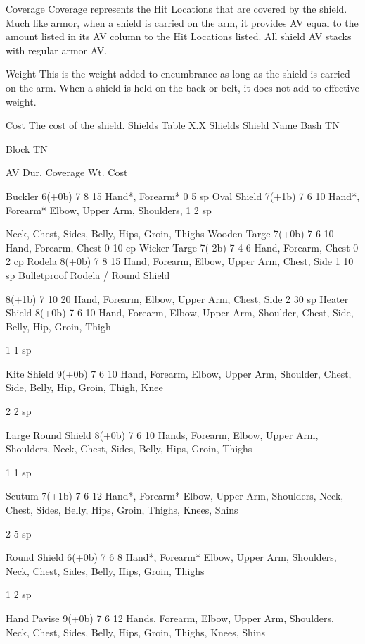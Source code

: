 \documentclass[oneside,11pt,english]{book}
\begin{document}
Coverage 
Coverage represents the Hit Locations that are covered by the shield. Much like armor, when a shield is 
carried on the arm, it provides AV equal to the amount listed in its AV column to the Hit Locations listed. 
All shield AV stacks with regular armor AV. 

 

Weight 
This is the weight added to encumbrance as long as the shield is carried on the arm. When a shield is held 
on the back or belt, it does not add to effective weight. 

 

Cost 
The cost of the shield. 
Shields 
Table X.X Shields 
Shield Name Bash 
TN 

Block 
TN 

AV Dur. Coverage Wt. Cost 

Buckler 6(+0b) 7 8 15 Hand*, Forearm* 0 5 sp 
Oval Shield 7(+1b) 7 6 10 Hand*, Forearm* Elbow, Upper Arm, Shoulders, 1 2 sp 


Neck, Chest, Sides, Belly, Hips, Groin, Thighs 
Wooden Targe 7(+0b) 7 6 10 Hand, Forearm, Chest 0 10 
cp 
Wicker Targe 7(-2b) 7 4 6 Hand, Forearm, Chest 0 2 cp 
Rodela 8(+0b) 7 8 15 Hand, Forearm, Elbow, Upper Arm, Chest, Side 1 10 
sp 
Bulletproof Rodela / 
Round Shield 

8(+1b) 7 10 20 Hand, Forearm, Elbow, Upper Arm, Chest, Side 2 30 
sp 
Heater Shield 8(+0b) 7 6 10 Hand, Forearm, Elbow, Upper Arm, Shoulder, Chest, 
Side, Belly, Hip, Groin, Thigh 

1 1 sp 

Kite Shield 9(+0b) 7 6 10 Hand, Forearm, Elbow, Upper Arm, Shoulder, Chest, 
Side, Belly, Hip, Groin, Thigh, Knee 

2 2 sp 

Large Round Shield 8(+0b) 7 6 10 Hands, Forearm, Elbow, Upper Arm, Shoulders, Neck, 
Chest, Sides, Belly, Hips, Groin, Thighs 

1 1 sp 

Scutum 7(+1b) 7 6 12 Hand*, Forearm* Elbow, Upper Arm, Shoulders, 
Neck, Chest, Sides, Belly, Hips, Groin, Thighs, Knees, 
Shins 

2 5 sp 

Round Shield 6(+0b) 7 6 8 Hand*, Forearm* Elbow, Upper Arm, Shoulders, 
Neck, Chest, Sides, Belly, Hips, Groin, Thighs 

1 2 sp 

Hand Pavise 9(+0b) 7 6 12 Hands, Forearm, Elbow, Upper Arm, Shoulders, Neck, 
Chest, Sides, Belly, Hips, Groin, Thighs, Knees, Shins 
\end{document}
